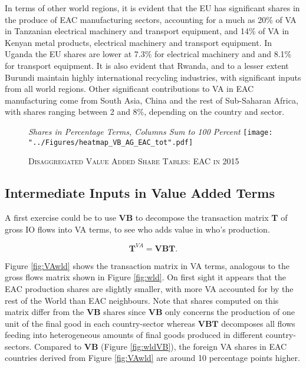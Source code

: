 \documentclass[a4paper]{article}
\begin{document}
In terms of other world regions, it is evident that the EU has significant shares in the produce of EAC manufacturing sectors, accounting for a much as 20\% of VA in Tanzanian electrical machinery and transport equipment, and 14\% of VA in Kenyan metal products, electrical machinery and transport equipment. In Uganda the EU shares are lower at 7.3\% for electrical machinery and  and 8.1\% for transport equipment. It is also evident that Rwanda, and to a lesser extent Burundi maintain highly international recycling industries, with significant inputs from all world regions. Other significant contributions to VA in EAC manufacturing come from South Asia, China and the rest of Sub-Saharan Africa, with shares ranging between 2 and 8\%, depending on the country and sector. 

\begin{figure}[h!]
\centering
\caption{\label{fig:eacVB}\textsc{Disaggregated Value Added Share Tables: EAC in 2015}}
\small{\textit{Shares in Percentage Terms, Columns Sum to 100 Percent}}
\texttt{[image: "../Figures/heatmap\_VB\_AG\_EAC\_tot".pdf]} %
\end{figure}
\FloatBarrier

\subsection{Intermediate Inputs in Value Added Terms}

A first exercise could be to use \textbf{VB} to decompose the transaction matrix \textbf{T} of gross IO flows into VA terms, to see who adds value in who's production.  

\begin{equation}
\textbf{T}^{VA} = \textbf{VB} \textbf{T}.
\end{equation} 

Figure \ref{fig:VAwld} shows the transaction matrix in VA terms, analogous to the gross flows matrix shown in Figure \ref{fig:wld}. On first sight it appears that the EAC production shares are slightly smaller, with more VA accounted for by the rest of the World than EAC neighbours. Note that shares computed on this matrix differ from the \textbf{VB} shares since \textbf{VB} only concerns the production of one unit of the final good in each country-sector whereas $\textbf{VB} \textbf{T}$ decomposes all flows feeding into heterogeneous amounts of final goods produced in different country-sectors. Compared to  \textbf{VB} (Figure \ref{fig:wldVB}), the foreign VA shares in EAC countries derived from Figure \ref{fig:VAwld} are around 10 percentage points higher. 
\end{document}
